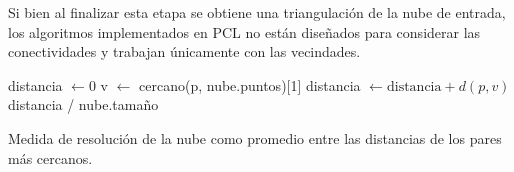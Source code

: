 Si bien al finalizar esta etapa se obtiene una triangulación de la nube de entrada,
los algoritmos implementados en PCL no están diseñados para considerar las conectividades y trabajan únicamente con las vecindades.


\begin{algorithm}
	\begin{algorithmic}[1]
			\State distancia $\gets0$
				\State v $\gets$ cercano(p, nube.puntos)[1]
				\State distancia $\gets \text{distancia} + d(p, v)$
			\EndFor
			\State\Return distancia / nube.tamaño
		\EndFunction
	\end{algorithmic}
	\caption{\label{alg:resolución_de_nube}Medida de resolución de la nube como promedio entre las distancias de los pares más cercanos.}
\end{algorithm}
